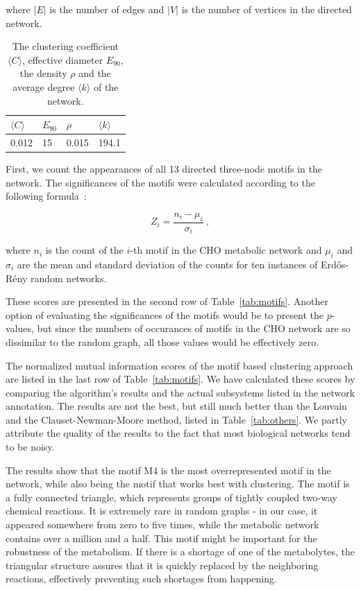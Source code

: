 \noindent
where $|E|$ is the number of edges and $|V|$ is the number of vertices in the
directed network.

\begin{table}
  \centering
  \begin{tabular}{l|l|l|l}
    $\langle C \rangle$ & $E_{90}$ & $\rho$ & $\langle k \rangle$ \\ \hline
    0.012 & 15 & 0.015 & 194.1
  \end{tabular}
  \caption{The clustering coefficient $\langle C\rangle$, effective diameter
    $E_{90}$, the density $\rho$ and the average degree $\langle k \rangle$ of
    the network.}
  \label{tab:metrics}
\end{table}

First, we count the appearances of all 13 directed three-node motifs in the
network. The significances of the motifs were calculated according to the
following formula~\cite{milo2002network}:

\begin{equation}
  Z_i = \frac{n_i - \mu_i}{\sigma_i}\ ,
\end{equation}

\noindent
where $n_i$ is the count of the $i$-th motif in the CHO metabolic network
and $\mu_{i}$ and $\sigma_{i}$ are the mean and standard deviation of the
counts for ten instances of Erdős-Rény random networks.

These scores are presented in the second row of Table~\ref{tab:motifs}. Another
option of evaluating the significances of the motifs would be to present the
$p$-values, but since the numbers of occurances of motifs in the CHO network are
so dissimilar to the random graph, all those values would be effectively zero.

The normalized mutual information scores of the motif based clustering approach
are listed in the last row of Table~\ref{tab:motifs}. We have calculated these
scores by comparing the algorithm's results and the actual subsystems listed in
the network annotation. The results are not the best, but still much better than
the Louvain and the Clauset-Newman-Moore method, listed in
Table~\ref{tab:others}. We partly attribute the quality of the results to the
fact that most biological networks tend to be noisy.

The results show that the motif M4 is the most overrepresented motif in the
network, while also being the motif that works best with clustering. The motif
is a fully connected triangle, which represents groups of tightly coupled
two-way chemical reactions. It is extremely rare in random graphs - in our case,
it appeared somewhere from zero to five times, while the metabolic network
contains over a million and a half. This motif might be important for the
robustness of the metabolism. If there is a shortage of one of the metabolytes,
the triangular structure assures that it is quickly replaced by the neighboring
reactions, effectively preventing such shortages from happening.

